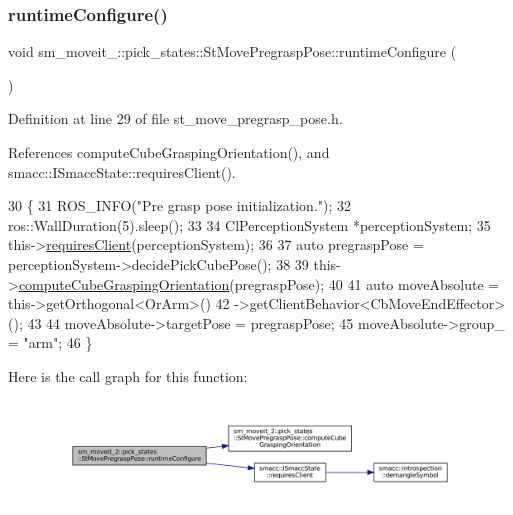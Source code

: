 \subsubsection{\texorpdfstring{runtime\+Configure()}{runtimeConfigure()}}
{\footnotesize\ttfamily void sm\+\_\+moveit\+\_\+::pick\+\_\+states\+::\+St\+Move\+Pregrasp\+Pose\+::runtime\+Configure (\begin{DoxyParamCaption}{ }\end{DoxyParamCaption})\hspace{0.3cm}{\ttfamily [inline]}}



Definition at line 29 of file st\+\_\+move\+\_\+pregrasp\+\_\+pose.\+h.



References compute\+Cube\+Grasping\+Orientation(), and smacc\+::\+I\+Smacc\+State\+::requires\+Client().


\begin{DoxyCode}
30     \{
31         ROS\_INFO(\textcolor{stringliteral}{"Pre grasp pose initialization."});
32         ros::WallDuration(5).sleep();
33 
34         ClPerceptionSystem *perceptionSystem;
35         this->\hyperlink{classsmacc_1_1ISmaccState_a7f95c9f0a6ea2d6f18d1aec0519de4ac}{requiresClient}(perceptionSystem);
36         
37         \textcolor{keyword}{auto} pregraspPose = perceptionSystem->decidePickCubePose();
38 
39         this->\hyperlink{structsm__moveit__2_1_1pick__states_1_1StMovePregraspPose_a0b8bc75057a2038564a749756eb59bde}{computeCubeGraspingOrientation}(pregraspPose);
40 
41         \textcolor{keyword}{auto} moveAbsolute = this->getOrthogonal<OrArm>()
42                                 ->getClientBehavior<CbMoveEndEffector>();
43 
44         moveAbsolute->targetPose = pregraspPose;
45         moveAbsolute->group\_ = \textcolor{stringliteral}{"arm"};
46     \}
\end{DoxyCode}
Here is the call graph for this function\+:
\nopagebreak
\begin{figure}[H]
\begin{center}
\leavevmode
\includegraphics[width=350pt]{structsm__moveit__2_1_1pick__states_1_1StMovePregraspPose_a1b02427ed66c6fbadbabc7c8d1dddabd_cgraph}
\end{center}
\end{figure}
\mbox{\label{structsm__moveit__2_1_1pick__states_1_1StMovePregraspPose_a9fe9954273b3ca549982f8d8a689a770}} 
